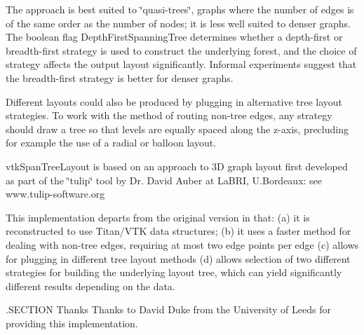 The approach is best suited to \char`\"{}quasi-\/trees\char`\"{}, graphs where the number of edges is of the same order as the number of nodes; it is less well suited to denser graphs. The boolean flag Depth\-First\-Spanning\-Tree determines whether a depth-\/first or breadth-\/first strategy is used to construct the underlying forest, and the choice of strategy affects the output layout significantly. Informal experiments suggest that the breadth-\/first strategy is better for denser graphs.

Different layouts could also be produced by plugging in alternative tree layout strategies. To work with the method of routing non-\/tree edges, any strategy should draw a tree so that levels are equally spaced along the z-\/axis, precluding for example the use of a radial or balloon layout.

vtk\-Span\-Tree\-Layout is based on an approach to 3\-D graph layout first developed as part of the \char`\"{}tulip\char`\"{} tool by Dr. David Auber at La\-B\-R\-I, U.\-Bordeaux\-: see www.\-tulip-\/software.\-org

This implementation departs from the original version in that\-: (a) it is reconstructed to use Titan/\-V\-T\-K data structures; (b) it uses a faster method for dealing with non-\/tree edges, requiring at most two edge points per edge (c) allows for plugging in different tree layout methods (d) allows selection of two different strategies for building the underlying layout tree, which can yield significantly different results depending on the data.

.S\-E\-C\-T\-I\-O\-N Thanks Thanks to David Duke from the University of Leeds for providing this implementation.

